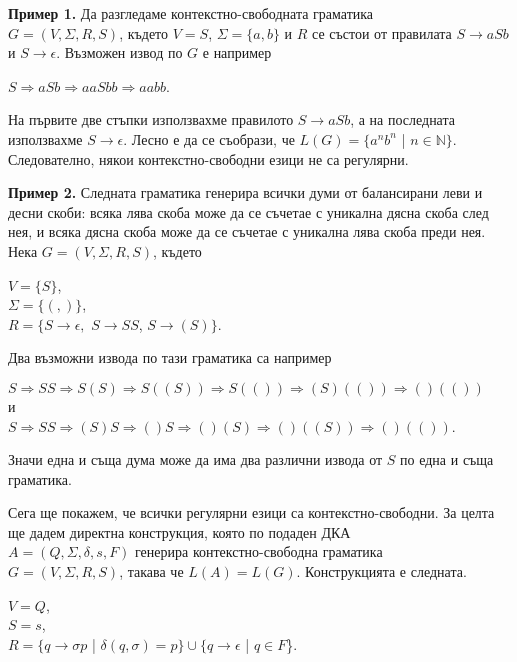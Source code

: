 \documentclass[openany]{book}
\begin{document}
    \textbf{Пример 1.} Да разгледаме контекстно-свободната граматика \\
    $G = (V,\Sigma,R,S)$, където $V = {S}$, $\Sigma = \{a,b\}$ и $R$ се 
    състои от правилата $S \rightarrow aSb$ и $S \rightarrow \epsilon$. Възможен
    извод по $G$ е например
    \begin{center}
        $S \Rightarrow aSb \Rightarrow aaSbb \Rightarrow aabb$.
    \end{center}
    На първите две стъпки използвахме правилото $S \rightarrow aSb$, а на последната
    използвахме $S \rightarrow \epsilon$. Лесно е да се съобрази, че $L(G) = \{a^nb^n$ | $n \in \mathbb{N}\}$.
    Следователно, някои контекстно-свободни езици не са регулярни.

    \vspace{15pt}

    \textbf{Пример 2.} Следната граматика генерира всички думи от балансирани леви
    и десни скоби: всяка лява скоба може да се съчетае с уникална дясна скоба след нея,
    и всяка дясна скоба може да се съчетае с уникална лява скоба преди нея. Нека 
    $G = (V,\Sigma,R,S)$, където
    \begin{center}
        $V = \{S\}$, \\
        $\Sigma = \{(,)\}$, \\
        $R = \{S \rightarrow \epsilon,$ $S \rightarrow SS$, $S\rightarrow (S)\}$.
    \end{center}

    Два възможни извода по тази граматика са например
    \begin{center}
        $S \Rightarrow SS \Rightarrow S(S) \Rightarrow S((S)) \Rightarrow S(()) \Rightarrow (S)(()) \Rightarrow ()(())$ \\
        \vspace{5pt}
        и \\
        \vspace{5pt}
        $S \Rightarrow SS \Rightarrow (S)S \Rightarrow ()S \Rightarrow ()(S) \Rightarrow ()((S)) \Rightarrow ()(())$.
    \end{center}
    Значи една и съща дума може да има два различни извода от $S$ по една и съща граматика.

    \vspace{15pt}

    \hspace{15pt}Сега ще покажем, че всички регулярни езици са контекстно-свободни. За целта ще дадем
    директна конструкция, която по подаден ДКА \\ $A = (Q,\Sigma,\delta,s,F)$ генерира контекстно-свободна граматика \\
    $G=(V,\Sigma,R,S)$, такава че $L(A) = L(G)$. Конструкцията е следната.
    \begin{center}
        $V = Q$, \\
        $S = s$, \\
        $R = \{q \rightarrow \sigma p$ | $\delta(q,\sigma) = p\} \cup \{q \rightarrow \epsilon$ | $q \in F$\}.
    \end{center}
\end{document}
